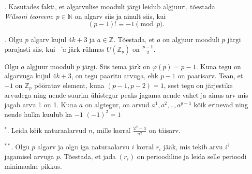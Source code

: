 \documentclass[a4paper, 10pt]{article}
\newcommand{\Z}{\mathbb{Z}}
\newcommand{\N}{\mathbb{N}}
\begin{document}
. Kasutades fakti, et algarvulise mooduli järgi leidub algjuuri, tõestada \\\emph{Wilsoni teoreem}:
$p\in\N$ on algarv siis ja ainult siis, kui 
$$
(p-1)!\equiv -1 \pmod{p}.
$$

\smallskip

. Olgu $p$ algarv kujul $4k+3$ ja $a\in\Z$. Tõestada, et $a$ on algjuur mooduli $p$ järgi parajasti siis, kui $\overline{-a}$ järk rühmas  $U(\Z_p)$ on $\frac{p-1}{2}$. 

\bigskip
Olgu $a$ algjuur mooduli $p$ järgi. Siis tema järk on $\varphi(p)=p-1$. Kuna tegu on algarvuga kujul $4k+3$, on tegu paaritu arvuga, ehk $p-1$ on paarisarv. Tean, et $-1$ on $\Z_p$ pööratav element, kuna $(p-1,p-2)=1$, sest tegu on järjestike arvudega ning nende suurim ühistegur peaks jagama nende vahet ja ainus arv mis jagab arvu 1 on 1. Kuna $a$ on algtegur, on arvud $a^1,a^2,..,a^{p-1}$ kõik erinevad ning nende hulka kuulub ka $-1$  $(-1)^2=1$
\bigskip

${^*}$. Leida kõik naturaalarvud $n$, mille korral $\frac{2^n+1}{n^2}$ on täisarv. 

\bigskip

${^{**}}$. Olgu $p$ algarv ja olgu iga naturaalarvu $i$ korral $r_i$ jääk, mis tekib arvu $i^i$ jagamisel arvuga $p$. Tõestada, et jada $(r_i)$ on perioodiline ja leida selle perioodi minimaalne pikkus. 
\end{document}
